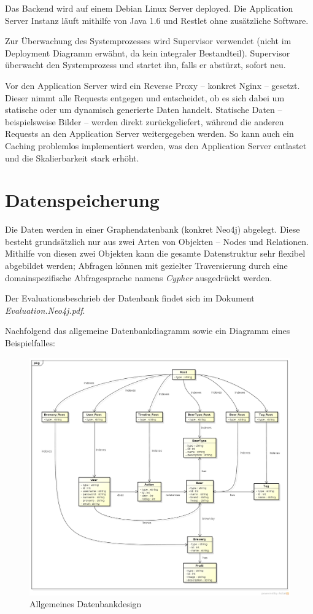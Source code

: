 \documentclass[10pt,a4paper]{scrartcl}
\begin{document}
Das Backend wird auf einem Debian Linux Server deployed. Die Application Server Instanz läuft
mithilfe von Java 1.6 und Restlet ohne zusätzliche Software.

Zur Überwachung des Systemprozesses
wird Supervisor verwendet (nicht im Deployment Diagramm erwähnt, da kein integraler Bestandteil).
Supervisor überwacht den Systemprozess und startet ihn, falls er abstürzt, sofort neu. 

Vor den Application Server wird ein Reverse Proxy -- konkret Nginx -- gesetzt. Dieser nimmt alle
Requests entgegen und entscheidet, ob es sich dabei um statische oder um dynamisch generierte Daten
handelt. Statische Daten -- beispielsweise Bilder -- werden direkt zurückgeliefert, während
die anderen Requests an den Application Server weitergegeben werden. So kann auch ein Caching
problemlos implementiert werden, was den Application Server entlastet und die Skalierbarkeit stark
erhöht.


\section{Datenspeicherung}

Die Daten werden in einer Graphendatenbank (konkret Neo4j) abgelegt. Diese besteht grundsätzlich nur
aus zwei Arten von Objekten -- Nodes und Relationen. Mithilfe von diesen zwei Objekten kann die
gesamte Datenstruktur sehr flexibel abgebildet werden; Abfragen können mit gezielter Traversierung
durch eine domainspezifische Abfragesprache namens \textit{Cypher} ausgedrückt werden.

Der Evaluationsbeschrieb der Datenbank findet sich im Dokument \textit{Evaluation.Neo4j.pdf}.

Nachfolgend das allgemeine Datenbankdiagramm sowie ein Diagramm eines Beispielfalles:

\begin{figure}[H]
	\includegraphics[height=0.9\textwidth,angle=90]{Database_Design_Graph.png}
	\caption{Allgemeines Datenbankdesign}
	\label{fig:database_design}
\end{figure}
\end{document}
